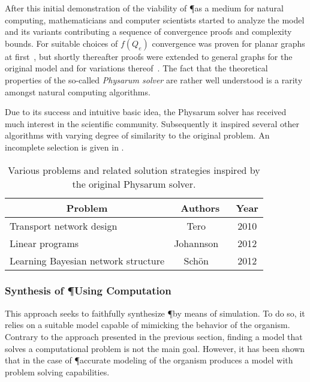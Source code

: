 			After this initial demonstration of the viability of \P as a medium for natural computing, mathematicians and computer scientists started to analyze the model and its variants contributing a sequence of convergence proofs and complexity bounds. For suitable choices of $f(Q_e)$ convergence was proven for planar graphs at first~\cite{miyaji2007mathematical,miyaji2008physarum}, but shortly thereafter proofs were extended to general graphs for the original model and for variations thereof~\cite{bonifaci2012physarum,bonifaci2013physarum,ito2011convergence,becchetti2013physarum}. The fact that the theoretical properties of the so-called \emph{Physarum solver} are rather well understood is a rarity amongst natural computing algorithms.

			Due to its success and intuitive basic idea, the Physarum solver has received much interest in the scientific community. Subsequently it inspired several other algorithms with varying degree of similarity to the original problem. An incomplete selection is given in . 

			\begin{table}
				\centering
				\begin{tabular}{@{} l *2c @{}}
				\toprule
				 \multicolumn{1}{c}{Problem}    & Authors  & Year   \\ 
				\midrule
				 Transport network design & Tero \etal~\cite{tero2010rules} & 2010 \\
				 Linear programs & Johannson \etal~\cite{Johannson2012} & 2012  \\ 
				 Learning Bayesian network structure & Sch\"on \etal~\cite{schon2012structure} & 2012  \\ 
				\bottomrule
				\end{tabular}
				\caption[Computing inspired by \P]{Various problems and related solution strategies inspired by the original Physarum solver.}
				\label{tab:list_inspired}
			\end{table}

			\FloatBarrier

		\subsubsection{Synthesis of \P Using Computation}

			This approach seeks to faithfully synthesize \P by means of simulation. To do so, it relies on a suitable model capable of mimicking the behavior of the organism. Contrary to the approach presented in the previous section, finding a model that solves a computational problem is not the main goal. However, it has been shown that in the case of \P accurate modeling of the organism produces a model with problem solving capabilities. 

